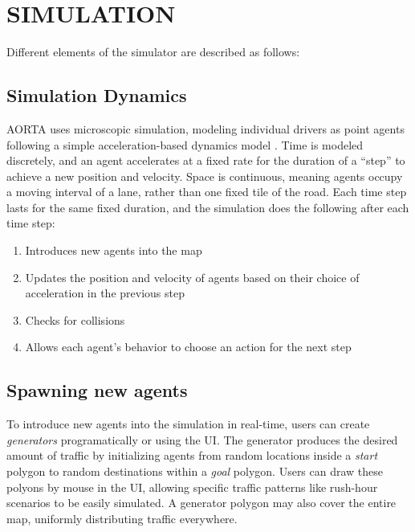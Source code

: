 \documentclass[letterpaper, 10 pt, conference]{ieeeconf}  %
\begin{document}

\section{SIMULATION}
\label{sec:simulation}

Different elements of the simulator are described as follows:

\subsection{Simulation Dynamics} 

AORTA uses microscopic simulation, modeling individual drivers as point agents
following a simple acceleration-based dynamics model .  Time is modeled discretely, and an
agent accelerates at a fixed rate for the duration of a ``step'' to achieve a
new position and velocity. Space is continuous, meaning agents occupy a moving
interval of a lane, rather than one fixed tile of the road. Each time step
lasts for the same fixed duration, and the simulation does the following after
each time step:

% 

\begin{enumerate}
  \item Introduces new agents into the map
  \item Updates the position and velocity of agents based on their choice of
        acceleration in the previous step
  \item Checks for collisions
  \item Allows each agent's behavior to choose an action for the next step
\end{enumerate}


\subsection{Spawning new agents}

To introduce new agents into the simulation in real-time, users can create
\emph{generators} programatically or using the UI. The generator produces the
desired amount of traffic by initializing agents from random locations inside a
\textit{start} polygon to random destinations within a \textit{goal} polygon.
Users can draw these polyons by mouse in the UI, allowing specific traffic
patterns like rush-hour scenarios to be easily simulated. A generator polygon
may also cover the entire map, uniformly distributing traffic everywhere.
\end{document}
